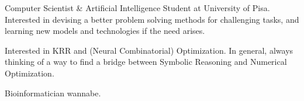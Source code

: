 

\begin{cvparagraph}

Computer Scientist \& Artificial Intelligence Student at University of Pisa. Interested in devising a better problem solving methods for challenging tasks, and learning new models and technologies if the need arises. 

Interested in KRR and (Neural Combinatorial) Optimization. In general, always thinking of a way to find a bridge between Symbolic Reasoning and Numerical Optimization.

Bioinformatician wannabe.
\end{cvparagraph}
